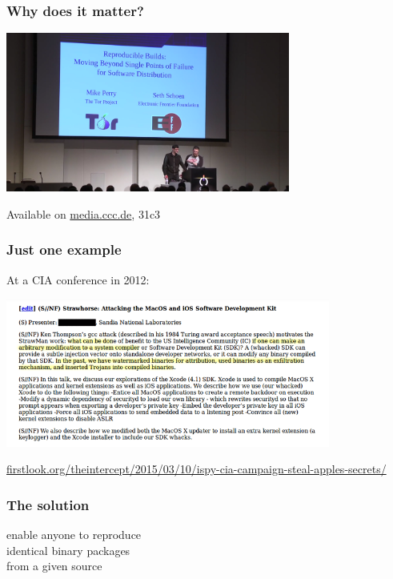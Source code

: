 \documentclass[14pt,aspectratio=169]{beamer}
\begin{document}
\begin{frame}[fragile]
 \frametitle{Why does it matter?}

 \begin{center}
  \includegraphics[width=0.7\textwidth]{images/31c3.png}

  Available on \url{media.ccc.de}, 31c3
 \end{center}
\end{frame}

\begin{frame}[fragile]
 \frametitle{Just one example}

 At a CIA conference in 2012:
 \begin{center}
  \includegraphics[width=0.8\textwidth]{images/strawhorse.png}

  {\footnotesize
  \url{firstlook.org/theintercept/2015/03/10/ispy-cia-campaign-steal-apples-secrets/}
  }
 \end{center}
\end{frame}

\begin{frame}
 \frametitle{The solution}

 \begin{center}
 \Large
 enable anyone to reproduce\\
 identical binary packages\\
 from a given source
\end{center}

\end{frame}
\end{document}
